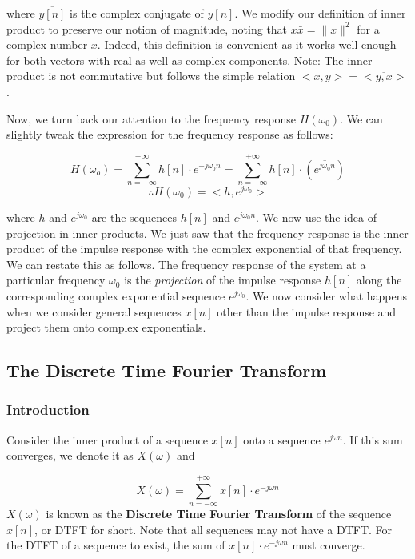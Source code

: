 \documentclass{article}
\theoremstyle{definition}
\begin{document}
where $\overline{y[n]}$ is the complex conjugate of $y[n]$. We modify our definition of inner product to preserve our notion of magnitude, noting that $x \bar{x} = \| x \| ^2$ for a complex number $x$. Indeed, this definition is convenient as it works well enough for both vectors with real as well as complex components. Note: The inner product is not commutative but follows the simple relation $<x,y> = \overline{<y,x>}$. \smallskip

Now, we turn back our attention to the frequency response $H(\omega_0)$. We can slightly tweak the expression for the frequency response as follows:

\[
	H(\omega_o) = \sum_{n = -\infty}^{+\infty} h[n] \cdot e^{-j\omega_0 n} = \sum_{n = -\infty}^{+\infty} h[n] \cdot (\overline{e^{j\omega_0 n}})
\]
	\[
	\therefore \boxed{H(\omega_0) = <h , e^{j\omega_0} >}
\]

where $h$ and $e^{j\omega_0}$ are the sequences $h[n]$ and $e^{j\omega_0 n}$. We now use the idea of projection in inner products. We just saw that the frequency response is the inner product of the impulse response with the complex exponential of that frequency. We can restate this as follows. The frequency response of the system at a particular frequency $\omega_0$ is the \textit{projection} of the impulse response $h[n]$ along the corresponding complex exponential sequence $e^{j\omega_0}$. We now consider what happens when we consider general sequences $x[n]$ other than the impulse response and project them onto complex exponentials. 

\subsection{The Discrete Time Fourier Transform}
\subsubsection{Introduction}

Consider the inner product of a sequence $x[n]$ onto a sequence $e^{j\omega n}$. If this sum converges, we denote it as $X(\omega)$ and 

\[
	\boxed{X(\omega) = \sum_{n=-\infty}^{+\infty} x[n] \cdot e^{-j\omega n} }
\]
$X(\omega)$ is known as the \textbf{Discrete Time Fourier Transform} of the sequence $x[n]$, or DTFT for short. Note that all sequences may not have a DTFT. For the DTFT of a sequence to exist, the sum of $x[n] \cdot e^{-j\omega n}$ must converge. \smallskip
\end{document}
